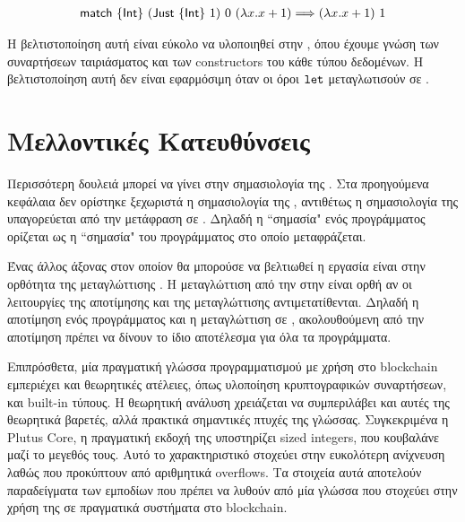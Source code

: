 \begin{align*}
  \operatorname{\textsf{match}}\ \{\operatorname{\textsf{Int}}\}\ (\operatorname{\textsf{Just}}\ \{\operatorname{\textsf{Int}}\}\ 1)\ 0\ (\lambda x . x+1) \Longrightarrow (\lambda x . x+1)\ 1
  \end{align*}

  Η βελτιστοποίηση αυτή είναι εύκολο να υλοποιηθεί στην \FIR{}, όπου έχουμε γνώση 
  των συναρτήσεων ταιριάσματος και των constructors του κάθε τύπου δεδομένων.
  Η βελτιστοποίηση αυτή δεν είναι εφαρμόσιμη όταν οι όροι $\operatorname{\texttt{let}}$ μεταγλωτισούν σε \FOMF{}.
   

   \section{Μελλοντικές Κατευθύνσεις}



   Περισσότερη δουλειά μπορεί να γίνει στην σημασιολογία της \FIR{}. Στα προηγούμενα κεφάλαια δεν
   ορίστηκε ξεχωριστά η σημασιολογία της \FIR{}, αντιθέτως η σημασιολογία της υπαγορεύεται από την
   μετάφραση σε \FOMF{}. Δηλαδή η ``σημασία" ενός προγράμματος \FIR{} ορίζεται ως η ``σημασία"
   του προγράμματος \FOMF{} στο οποίο μεταφράζεται.

   Ένας άλλος άξονας στον οποίον θα μπορούσε να βελτιωθεί η εργασία είναι στην ορθότητα της μεταγλώττισης
   . Η μεταγλώττιση από την \FIR{} στην \FOMF{} είναι ορθή αν οι λειτουργίες της αποτίμησης και της μεταγλώττισης αντιμετατίθενται. Δηλαδή η αποτίμηση ενός προγράμματος \FIR{} και η μεταγλώττιση
   σε \FOMF{}, ακολουθούμενη από την αποτίμηση πρέπει να δίνουν το ίδιο αποτέλεσμα για όλα τα προγράμματα.

   Επιπρόσθετα, μία πραγματική γλώσσα προγραμματισμού με χρήση στο blockchain εμπεριέχει και
   θεωρητικές ατέλειες, όπως υλοποίηση κρυπτογραφικών συναρτήσεων, και built-in τύπους. Η θεωρητική
   ανάλυση χρειάζεται να συμπεριλάβει και αυτές της θεωρητικά βαρετές, αλλά πρακτικά σημαντικές πτυχές 
   της γλώσσας. Συγκεκριμένα η Plutus Core, η πραγματική εκδοχή της \FOMF{} υποστηρίζει sized integers,
   που κουβαλάνε μαζί το μεγεθός τους. Αυτό το χαρακτηριστικό στοχεύει στην ευκολότερη ανίχνευση 
   λαθώς που προκύπτουν από αριθμητικά overflows. Τα στοιχεία αυτά αποτελούν παραδείγματα των
   εμποδίων που πρέπει να λυθούν από μία γλώσσα που στοχεύει στην χρήση της σε πραγματικά συστήματα
   στο blockchain.

